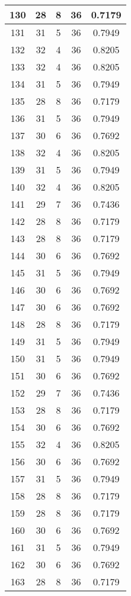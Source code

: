 \documentclass[letterpaper, 12pt]{article}
\begin{document}
\begin{longtable}{|c|c|c|c|c|}
\hline
130 & 28 & 8 & 36 & 0.7179 \\
\hline
131 & 31 & 5 & 36 & 0.7949 \\
\hline
132 & 32 & 4 & 36 & 0.8205 \\
\hline
133 & 32 & 4 & 36 & 0.8205 \\
\hline
134 & 31 & 5 & 36 & 0.7949 \\
\hline
135 & 28 & 8 & 36 & 0.7179 \\
\hline
136 & 31 & 5 & 36 & 0.7949 \\
\hline
137 & 30 & 6 & 36 & 0.7692 \\
\hline
138 & 32 & 4 & 36 & 0.8205 \\
\hline
139 & 31 & 5 & 36 & 0.7949 \\
\hline
140 & 32 & 4 & 36 & 0.8205 \\
\hline
141 & 29 & 7 & 36 & 0.7436 \\
\hline
142 & 28 & 8 & 36 & 0.7179 \\
\hline
143 & 28 & 8 & 36 & 0.7179 \\
\hline
144 & 30 & 6 & 36 & 0.7692 \\
\hline
145 & 31 & 5 & 36 & 0.7949 \\
\hline
146 & 30 & 6 & 36 & 0.7692 \\
\hline
147 & 30 & 6 & 36 & 0.7692 \\
\hline
148 & 28 & 8 & 36 & 0.7179 \\
\hline
149 & 31 & 5 & 36 & 0.7949 \\
\hline
150 & 31 & 5 & 36 & 0.7949 \\
\hline
151 & 30 & 6 & 36 & 0.7692 \\
\hline
152 & 29 & 7 & 36 & 0.7436 \\
\hline
153 & 28 & 8 & 36 & 0.7179 \\
\hline
154 & 30 & 6 & 36 & 0.7692 \\
\hline
155 & 32 & 4 & 36 & 0.8205 \\
\hline
156 & 30 & 6 & 36 & 0.7692 \\
\hline
157 & 31 & 5 & 36 & 0.7949 \\
\hline
158 & 28 & 8 & 36 & 0.7179 \\
\hline
159 & 28 & 8 & 36 & 0.7179 \\
\hline
160 & 30 & 6 & 36 & 0.7692 \\
\hline
161 & 31 & 5 & 36 & 0.7949 \\
\hline
162 & 30 & 6 & 36 & 0.7692 \\
\hline
163 & 28 & 8 & 36 & 0.7179 \\

\end{longtable}
\end{document}

